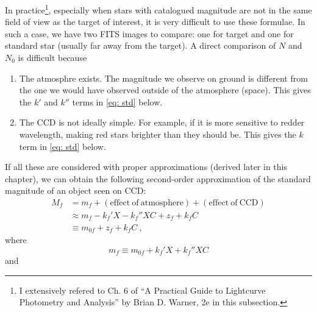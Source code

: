 In practice\footnote{I extensively refered to Ch. 6 of ``A Practical Guide to Lightcurve Photometry and Analysis'' by Brian D. Warner, 2e in this subsection.}, especially when stars with catalogued magnitude are not in the same field of view as the target of interest, it is very difficult to use these formulae. In such a case, we have two FITS images to compare: one for target and one for standard star (usually far away from the target). A direct comparison of $ N $ and $ N_0 $ is difficult because
\begin{enumerate}
\item The atmosphre exists. The magnitude we observe on ground is different from the one we would have observed outside of the atmosphere (space). This gives the $ k' $ and $ k'' $ terms in \cref{eq: std} below.
\item The CCD is not ideally simple. For example, if it is more sensitive to redder wavelength, making red stars brighter than they should be. This gives the $ k $ term in \cref{eq: std} below.
\end{enumerate}
If all these are considered with proper approximations (derived later in this chapter), we can obtain the following second-order approximation of the standard magnitude of an object seen on CCD:
\begin{equation}\label{eq: std}
\begin{aligned}
  M_f &= m_f + (\mathrm{effect\ of\ atmosphere}) + (\mathrm{effect\ of\ CCD}) \\
    &\approx m_f - k_f' X - k_f''XC + z_f + k_f C \\
    &\equiv m_{0f} + z_f + k_f C ~,
\end{aligned}
\end{equation}
where
\begin{equation}
  m_{f} \equiv m_{0f} + k_f'X + k_f'' XC
\end{equation}
and
